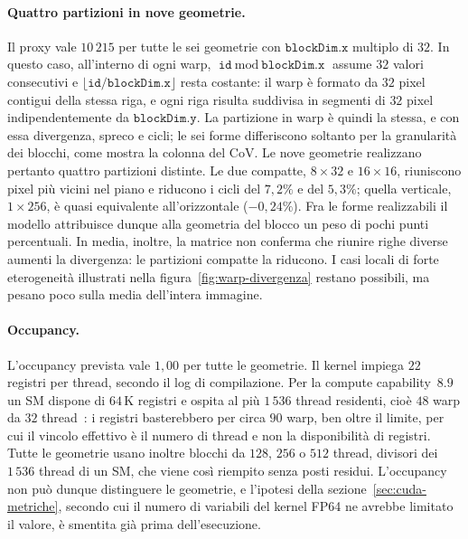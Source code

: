 \paragraph{Quattro partizioni in nove geometrie.}
Il proxy vale $10\,215$ per tutte le sei geometrie con $\texttt{blockDim.x}$
multiplo di $32$. In questo caso, all'interno di ogni warp,
$\texttt{id} \bmod \texttt{blockDim.x}$ assume $32$ valori consecutivi e
$\lfloor \texttt{id}/\texttt{blockDim.x} \rfloor$ resta costante: il warp è
formato da $32$ pixel contigui della stessa riga, e ogni riga risulta suddivisa
in segmenti di $32$ pixel indipendentemente da $\texttt{blockDim.y}$. La
partizione in warp è quindi la stessa, e con essa divergenza, spreco e cicli; le
sei forme differiscono soltanto per la granularità dei blocchi, come mostra la
colonna del CoV. Le nove geometrie realizzano pertanto quattro partizioni
distinte. Le due compatte, $8{\times}32$ e $16{\times}16$, riuniscono pixel più
vicini nel piano e riducono i cicli del $7{,}2\%$ e del $5{,}3\%$; quella
verticale, $1{\times}256$, è quasi equivalente all'orizzontale ($-0{,}24\%$). Fra
le forme realizzabili il modello attribuisce dunque alla geometria del blocco un
peso di pochi punti percentuali. In media, inoltre, la matrice non conferma che
riunire righe diverse aumenti la divergenza: le partizioni compatte la riducono. I
casi locali di forte eterogeneità illustrati nella
figura~\ref{fig:warp-divergenza} restano possibili, ma pesano poco sulla media
dell'intera immagine.

\paragraph{Occupancy.}
L'occupancy prevista vale $1{,}00$ per tutte le geometrie. Il kernel impiega $22$
registri per thread, secondo il log di compilazione. Per la compute
capability~$8.9$ un SM dispone di $64$\,K registri e ospita al più $1\,536$
thread residenti, cioè $48$ warp da $32$ thread~\cite{nvidia_cuda_cc}: i
registri basterebbero per circa $90$ warp, ben oltre il limite, per cui il
vincolo effettivo è il numero di thread e non la disponibilità di registri. Tutte le geometrie usano inoltre
blocchi da $128$, $256$ o $512$ thread, divisori dei $1\,536$ thread di un SM,
che viene così riempito senza posti residui. L'occupancy non può dunque
distinguere le geometrie, e l'ipotesi della sezione~\ref{sec:cuda-metriche},
secondo cui il numero di variabili del kernel FP64 ne avrebbe limitato il valore,
è smentita già prima dell'esecuzione.

